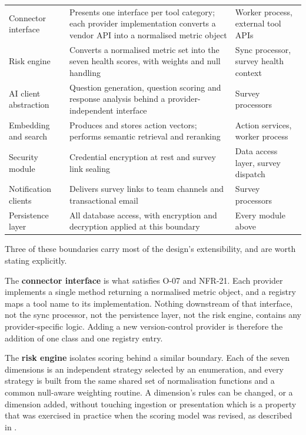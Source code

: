 \begin{longtable}{
  >{\raggedright\arraybackslash}p{}
  >{\raggedright\arraybackslash}p{}
  >{\raggedright\arraybackslash}p{}
}
\addlinespace
Connector interface & Presents one interface per tool category; each provider
implementation converts a vendor API into a normalised metric object & Worker
process, external tool APIs \\
\addlinespace
Risk engine & Converts a normalised metric set into the seven health scores, with
weights and null handling & Sync processor, survey health context \\
\addlinespace
AI client abstraction & Question generation, question scoring and response analysis
behind a provider-independent interface & Survey processors \\
\addlinespace
Embedding and search & Produces and stores action vectors; performs semantic
retrieval and reranking & Action services, worker process \\
\addlinespace
Security module & Credential encryption at rest and survey link sealing & Data access
layer, survey dispatch \\
\addlinespace
Notification clients & Delivers survey links to team channels and transactional email
& Survey processors \\
\addlinespace
Persistence layer & All database access, with encryption and decryption applied at
this boundary & Every module above \\
\end{longtable}

Three of these boundaries carry most of the design's extensibility, and are worth
stating explicitly.

The \textbf{connector interface} is what satisfies O-07 and NFR-21. Each
provider implements a single method returning a normalised metric object, and a
registry maps a tool name to its implementation. Nothing downstream of that
interface, not the sync processor, not the persistence layer, not the risk
engine, contains any provider-specific logic. Adding a new version-control
provider is therefore the addition of one class and one registry entry.

The \textbf{risk engine} isolates scoring behind a similar boundary. Each of the
seven dimensions is an independent strategy selected by an enumeration, and every
strategy is built from the same shared set of normalisation functions and a
common null-aware weighting routine. A dimension's rules can be changed, or a
dimension added, without touching ingestion or presentation which is a property that
was exercised in practice when the scoring model was revised, as described in
.

